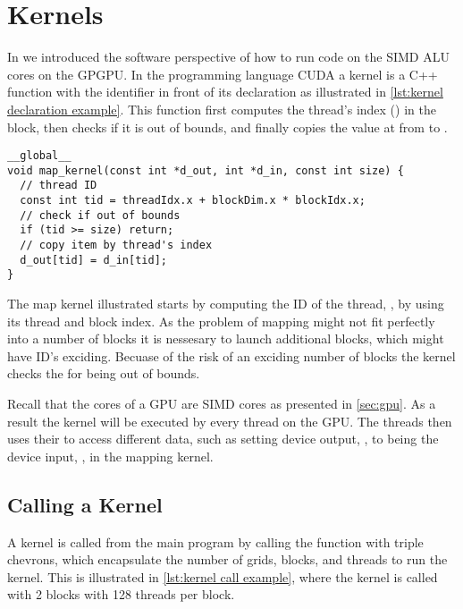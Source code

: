 \section{Kernels}
\label{sec:kernels}

In  we introduced the software perspective of how to run code on the SIMD ALU cores on the GPGPU.
In the programming language CUDA a kernel is a C++ function with the  identifier in front of its declaration as illustrated in \cref{lst:kernel declaration example}.
This function first computes the thread's index () in the block, then checks if it is out of bounds, and finally copies the value at  from  to .

\begin{lstlisting}[caption={Kernel declaration example}, label={lst:kernel declaration example}]
__global__
void map_kernel(const int *d_out, int *d_in, const int size) {
  // thread ID
  const int tid = threadIdx.x + blockDim.x * blockIdx.x;
  // check if out of bounds
  if (tid >= size) return;
  // copy item by thread's index
  d_out[tid] = d_in[tid];
}
\end{lstlisting}

The map kernel illustrated starts by computing the ID of the thread, , by using its thread and block index.
As the problem of mapping might not fit perfectly into a number of blocks it is nessesary to launch additional blocks, which might have ID's exciding.
Becuase of the risk of an exciding number of blocks the kernel checks the  for being out of bounds.

Recall that the cores of a GPU are SIMD cores as presented in \cref{sec:gpu}.
As a result the kernel will be executed by every thread on the GPU.
The threads then uses their  to access different data, such as setting device output, , to being the device input, , in the mapping kernel.

\subsection{Calling a Kernel}
\label{sec:calling a kernel}

A kernel is called from the main program by calling the function with triple chevrons, which encapsulate the number of grids, blocks, and threads to run the kernel.
This is illustrated in \cref{lst:kernel call example}, where the kernel is called with 2 blocks with 128 threads per block.

